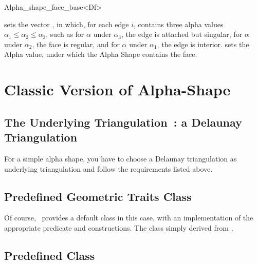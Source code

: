 \begin{ccClass}{Alpha_shape_face_base<Df>}
\ccModifiers

\begin{ccAdvanced}

{sets the vector , in which, for each edge $i$,  contains three
alpha values
 $\alpha_1 \leq \alpha_2 \leq \alpha_3$, such as for
$\alpha$ under $\alpha_3$, the edge is attached but singular,
for $\alpha$ under $\alpha_2$, the face is regular, and for $\alpha$
under $\alpha_1$, the edge is interior.}
{sets the Alpha value, under which the Alpha Shape contains the
face.}

\end{ccAdvanced}

\end{ccClass}


\section{Classic Version of Alpha-Shape}

\subsection*{The Underlying Triangulation~: a Delaunay Triangulation}

For a simple alpha shape, you have to choose a Delaunay triangulation as
underlying triangulation  and follow the requirements listed above.


\subsection*{Predefined Geometric Traits Class}

Of course,  \cgal\ provides a default  class in this
case, with an implementation of the appropriate predicate and constructions.
The class  simply derived from 
.


\subsection*{Predefined \protect {} Class}

